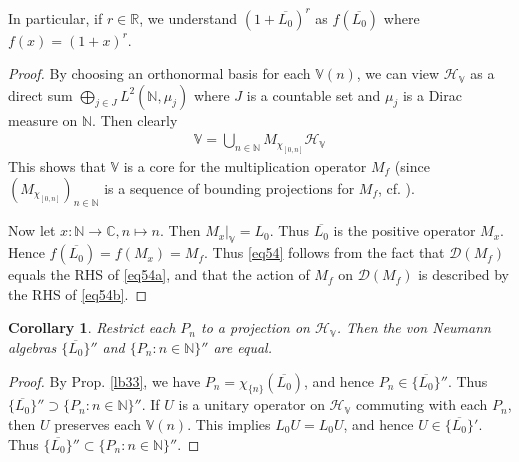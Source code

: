\documentclass[12pt,b5paper,notitlepage]{article}
\theoremstyle{definition}
\theoremstyle{plain}
\newtheorem{co}[df]{Corollary}
\newcommand{\ovl}{\overline}
\newcommand{\Dom}{\scr{D}}
\newcommand{\bk}[1]{\langle {#1}\rangle}
\newcommand{\scr}{\mathscr}
\newcommand{\im}{\mathbf{i}}
\newcommand{\Vbb}{\mathbb V}
\newcommand{\Cbb}{\mathbb C}
\newcommand{\Nbb}{\mathbb N}
\newcommand{\Rbb}{\mathbb R}
\newcommand{\Rng}{\mathrm{Rng}}
\newcommand{\HV}{\mathcal H_{\mathbb V}}
\numberwithin{equation}{section}
\begin{document}
In particular, if $r\in\Rbb$, we understand $(1+\ovl{L_0})^r$ as $f(\ovl{L_0})$ where $f(x)=(1+x)^r$. 


\begin{proof}





By choosing an orthonormal basis for each $\Vbb(n)$, we can view $\HV$ as a direct sum $\bigoplus_{j\in J}L^2(\Nbb,\mu_j)$ where $J$ is a countable set and $\mu_j$ is a Dirac measure on $\Nbb$. Then clearly
\begin{align*}
\Vbb=\bigcup_{n\in\Nbb} M_{\chi_{[0,n]}}\HV
\end{align*}
This shows that $\Vbb$ is a core for the multiplication operator $M_f$ (since $(M_{\chi_{[0,n]}})_{n\in\Nbb}$ is a sequence of bounding projections for $M_f$, cf. \cite[Sec. 8]{Gui-S}).

Now let $x:\Nbb\rightarrow\Cbb,n\mapsto n$. Then $M_x|_\Vbb=L_0$. Thus $\ovl{L_0}$ is the positive operator $M_x$. Hence $f(\ovl{L_0})=f(M_x)=M_f$. Thus \eqref{eq54} follows from the fact that $\Dom(M_f)$ equals the RHS of \eqref{eq54a}, and that the action of $M_f$ on $\Dom(M_f)$ is described by the RHS of \eqref{eq54b}.
\end{proof}

\begin{co}\label{lb69}
Restrict each $P_n$ to a projection on $\HV$. Then the von Neumann algebras $\{\ovl{L_0}\}''$ and $\{P_n:n\in\Nbb\}''$ are equal.
\end{co}

\begin{proof}
By Prop. \ref{lb33}, we have $P_n=\chi_{\{n\}}(\ovl{L_0})$, and hence $P_n\in\{\ovl{L_0}\}''$. Thus $\{\ovl{L_0}\}''\supset\{P_n:n\in\Nbb\}''$. If $U$ is a unitary operator on $\HV$ commuting with each $P_n$, then $U$ preserves each $\Vbb(n)$. This implies $L_0U=L_0U$, and hence $U\in\{\ovl{L_0}\}'$. Thus $\{\ovl{L_0}\}''\subset\{P_n:n\in\Nbb\}''$.
\end{proof}



\subsection{}
\end{document}
